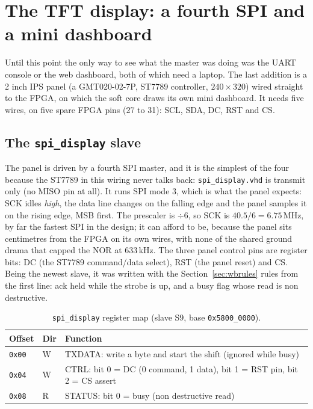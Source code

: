 \documentclass[a4paper,11pt]{article}
\begin{document}
\section{The TFT display: a fourth SPI and a mini dashboard}
\label{sec:display}

Until this point the only way to see what the master was doing was the UART
console or the web dashboard, both of which need a laptop. The last addition is
a 2 inch IPS panel (a GMT020-02-7P, ST7789 controller, $240\times320$) wired
straight to the FPGA, on which the soft core draws its own mini dashboard. It
needs five wires, on five spare FPGA pins (27 to 31): SCL, SDA, DC, RST and CS.

\subsection{The \texttt{spi\_display} slave}

The panel is driven by a fourth SPI master, and it is the simplest of the four
because the ST7789 in this wiring never talks back: \texttt{spi\_display.vhd}
is transmit only (no MISO pin at all). It runs SPI mode 3, which is what the
panel expects: SCK idles \emph{high}, the data line changes on the falling edge
and the panel samples it on the rising edge, MSB first. The prescaler is
$\div6$, so SCK is $40.5/6 = 6.75$\,MHz, by far the fastest SPI in the design;
it can afford to be, because the panel sits centimetres from the FPGA on its
own wires, with none of the shared ground drama that capped the NOR at
633\,kHz. The three panel control pins are register bits: DC (the ST7789
command/data select), RST (the panel reset) and CS. Being the newest slave, it
was written with the Section~\ref{sec:wbrules} rules from the first line: ack
held while the strobe is up, and a busy flag whose read is non destructive.

\begin{table}[H]
\centering
\caption{\texttt{spi\_display} register map (slave S9, base \texttt{0x5800\_0000}).}
\begin{tabular}{lll}
\toprule
\textbf{Offset} & \textbf{Dir} & \textbf{Function} \\
\midrule
\texttt{0x00} & W & TXDATA: write a byte and start the shift (ignored while busy) \\
\texttt{0x04} & W & CTRL: bit 0 = DC (0 command, 1 data), bit 1 = RST pin, bit 2 = CS assert \\
\texttt{0x08} & R & STATUS: bit 0 = busy (non destructive read) \\
\bottomrule
\end{tabular}
\end{table}
\end{document}
